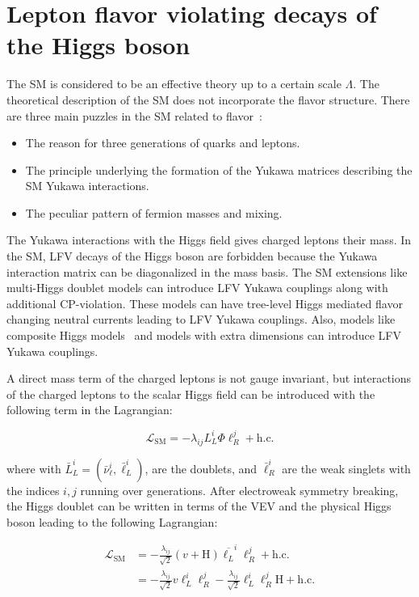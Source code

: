 \section{Lepton flavor violating decays of the Higgs boson}
The SM is considered to be an effective theory up to a certain scale $\Lambda$. The theoretical description of the SM does not incorporate the flavor structure. There are three main puzzles in the SM related to flavor~\cite{Raidal:2008jk}:
\begin{itemize}
  \item The reason for three generations of quarks and leptons.
  \item The principle underlying the formation of the Yukawa matrices describing the SM Yukawa interactions.
  \item The peculiar pattern of fermion masses and mixing.
\end{itemize}

The Yukawa interactions with the Higgs field gives charged leptons their mass. In the SM, LFV decays of the Higgs boson are forbidden because the Yukawa interaction matrix can be diagonalized in the mass basis. The SM extensions like multi-Higgs doublet models can introduce LFV Yukawa couplings along with additional CP-violation. These models can have tree-level Higgs mediated flavor changing neutral currents leading to LFV Yukawa couplings. Also, models like composite Higgs models~\cite{Blankenburg:2012ex} and models with extra dimensions can introduce LFV Yukawa couplings.

A direct mass term of the charged leptons is not gauge invariant, but interactions of the charged leptons to the scalar Higgs field can be introduced with the following term in the Lagrangian:

\begin{equation}
  \mathcal{L}_{\text{SM}}=-\lambda_{i j} L_{L}^{i} \Phi \ell_{R}^{j}+ \text{h.c.}
\end{equation}

where with $\bar{L}_{L}^{i}=(\bar{\nu}_{\ell}^{i}, \bar{\ell}_{L}^{i})$, are the \iso doublets, and $\bar{\ell}_{R}^{i}$ are the weak singlets with the indices $i, j$ running over generations. After electroweak symmetry breaking, the Higgs doublet can be written in terms of the VEV and the physical Higgs boson leading to the following Lagrangian:

\begin{equation}
  \begin{aligned}
    \mathcal{L}_{\text{SM}} &=-\frac{\lambda_{i j}}{\sqrt{2}}(v + \text{H}) \overline{\ell_{L}}^{i} \ell_{R}^{j}+ \text{h.c.} \\
    &=-\frac{\lambda_{i j}}{\sqrt{2}} v \ell_{L}^{i} \ell_{R}^{j} - \frac{\lambda_{i j}}{\sqrt{2}} \ell_{L}^{i} \ell_{R}^{j} \text{H} + \text{h.c.}
  \end{aligned}
\end{equation}

